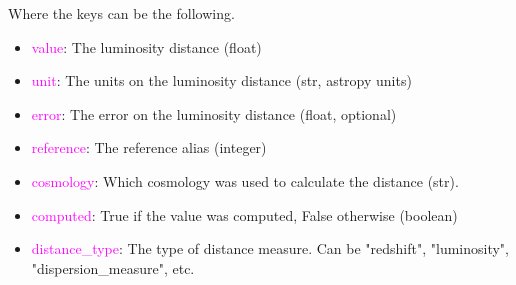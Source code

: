 \documentclass[tighten]{aastex631}
\newcommand{\element}[1]{\textcolor{orange}{#1}}
\newcommand{\keyword}[1]{\textcolor{magenta}{#1}}
\begin{document}
Where the keys can be the following.
\begin{itemize}
    \item \keyword{value}: The luminosity distance (float)
    \item \keyword{unit}: The units on the luminosity distance (str, astropy units)
    \item \keyword{error}: The error on the luminosity distance (float, optional)
    \item \keyword{reference}: The reference alias (integer)
    \item \keyword{cosmology}: Which cosmology was used to calculate the distance (str).
    \item \keyword{computed}: True if the value was computed, False otherwise (boolean)
    \item \keyword{distance\_type}: The type of distance measure. Can be "redshift", "luminosity", "dispersion\_measure", etc.
\end{itemize}


\end{document}
